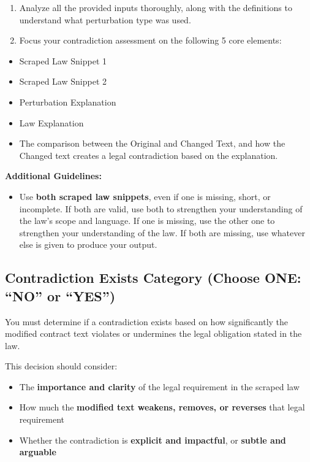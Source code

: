 \documentclass[11pt]{article}
\begin{document}
\begin{tcolorbox}[breakable,colback=lightestgray,colframe=black,title=\textbf{Legal LLM Validation Prompt}]
\begin{enumerate}
    \item Analyze all the provided inputs thoroughly, along with the definitions to understand what perturbation type was used.
    \item Focus your contradiction assessment on the following 5 core elements:
\end{enumerate}
\begin{itemize}
    \item Scraped Law Snippet 1
    \item Scraped Law Snippet 2
    \item Perturbation Explanation
    \item Law Explanation
    \item The comparison between the Original and Changed Text, and how the Changed text creates a legal contradiction based on the explanation.
\end{itemize}

\textbf{Additional Guidelines:}
\begin{itemize}
    \item Use \textbf{both scraped law snippets}, even if one is missing, short, or incomplete. If both are valid, use both to strengthen your understanding of the law's scope and language. If one is missing, use the other one to strengthen your understanding of the law. If both are missing, use whatever else is given to produce your output.
\end{itemize}

\subsection*{\textbf{Contradiction Exists Category (Choose ONE: ``NO'' or ``YES'')}}

You must determine if a contradiction exists based on how significantly the modified contract text violates or undermines the legal obligation stated in the law.

This decision should consider:
\begin{itemize}
    \item The \textbf{importance and clarity} of the legal requirement in the scraped law
    \item How much the \textbf{modified text weakens, removes, or reverses} that legal requirement
    \item Whether the contradiction is \textbf{explicit and impactful}, or \textbf{subtle and arguable}
\end{itemize}


\end{tcolorbox}
\end{document}

